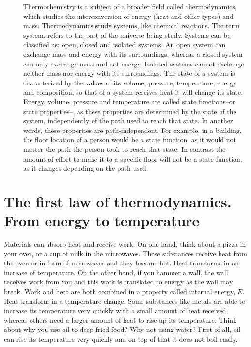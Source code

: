 \documentclass[main.tex]{subfiles}
\begin{document}
\begin{description}
\item[] 
Thermochemistry is a subject of a broader field called thermodynamics, which studies the interconversion of energy (heat and other types) and mass. Thermodynamics study systems, like chemical reactions. The term system, refers to the part of the universe being study. Systems can be classified as: open, closed and isolated systems. An open system can exchange mass and energy with its surroundings, whereas a closed system can only exchange mass and not energy. Isolated systems cannot exchange neither mass nor energy with its surroundings.
The state of a system is characterized by the values of its volume, pressure, temperature, energy and composition, so that of a system receives heat it will change its state. Energy, volume, pressure and temperature are called state functions--or state properties--, as these properties are determined by the state of the system, independently of the path used to reach that state. In another words, these properties are path-independent. For example, in a building, the floor location of a person would be a state function, as it would not matter the path the person took to reach that state. In contrast the amount of effort to make it to a specific floor will not be a state function, as it changes depending on the path used.






\end{description}


\section{The first law of thermodynamics. From energy  to temperature}
Materials can absorb heat and receive work. On one hand, think about a pizza in your over, or a cup of milk in the microwaves. These substances receive heat from the oven or in form of microwaves and they become hot. Heat transforms in an increase of temperature. 
On the other hand, if you hammer a wall, the wall receives work from you and this work is translated to energy as the wall may break. Work and heat are both combined in a property called internal energy, $E$.
Heat transform in a temperature change. Some substances like metals are able to increase its temperature very quickly with a small amount of heat received, whereas others need a larger amount of heat to rise up its temperature. Think about why you use oil to deep fried food? Why not using water? First of all, oil can rise its temperature very quickly and on top of that it does not boil easily.
\sloppy
 
\end{document}
